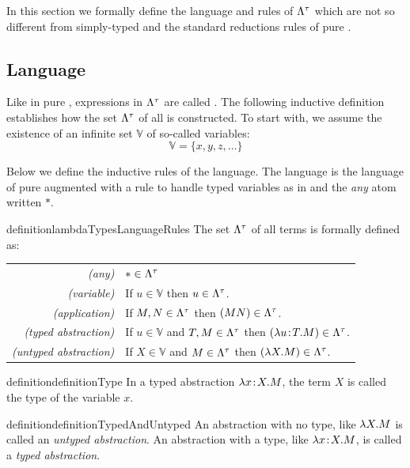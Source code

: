 In this section we formally define the language and rules of $\Lambda^{\tau}$ which are not so different from simply-typed \lambdacalc and the standard reductions rules of pure \lambdacalc.

\subsection{Language}

Like in pure \lambdacalc, expressions in $\Lambda^{\tau}$ are called \lambdaterms. The following inductive definition establishes how the set \(\Lambda^{\tau}\) of all \lambdaterms is constructed. To start with, we assume the existence of an infinite set \(\mathbb{V}\) of so-called variables:
\[
    \mathbb{V} = \{ x, y, z, \dots \}
\]

Below we define the inductive rules of the language. The language is the language of pure \lambdacalc augmented with a rule to handle typed variables as in \simplyTypedLambdaCalc and the \textit{any} atom written $*$.

\begin{reusable}{definition}{lambdaTypesLanguageRules}
    The set \(\Lambda^{\tau}\) of all terms is formally defined as:\blockspacer
    \begin{tabular}{rl}
        \textit{(any)}                  & $*\in \Lambda^{\tau}$ \\
        \textit{(variable)}             & If \(u \in \mathbb{V}\) then \(u \in \Lambda^{\tau}\). \\
        \textit{(application)}          & If \(M, N \in \Lambda^{\tau}\) then \((MN) \in \Lambda^{\tau}\).\\
        \textit{(typed abstraction)}    & If \(u \in \mathbb{V}\) and \(T, M \in \Lambda^{\tau}\) then \((\tabs u:T.M) \in \LambdaTau\).\\
        \textit{(untyped abstraction)}  & If \(X \in \mathbb{V}\) and \(M \in \Lambda^{\tau}\) then \((\lambda X.M) \in \Lambda^{\tau}\).\\
    \end{tabular}
\end{reusable}

\begin{reusable}{definition}{definitionType}
    In a typed abstraction $\tabs x:X.M$, the term $X$ is called the type of the variable $x$.
\end{reusable}

\begin{reusable}{definition}{definitionTypedAndUntyped}
    An abstraction with no type, like $\lambda X.M$ is called an \textit{untyped abstraction}.
    An abstraction with a type, like $\tabs x:X.M$, is called a \textit{typed abstraction}.
\end{reusable}

